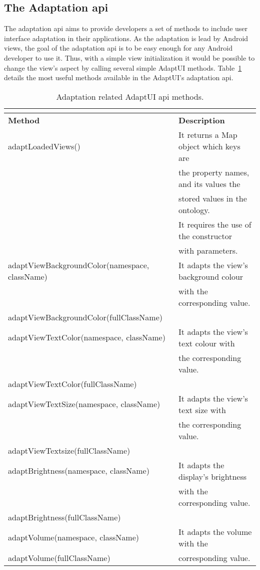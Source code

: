 \subsection{The Adaptation \ac{api}}
\label{sec:adaptation_api}

The adaptation \ac{api} aims to provide developers a set of methods to include
user interface adaptation in their applications. As the adaptation is lead by
Android views, the goal of the adaptation \ac{api} is to be easy enough for
any Android developer to use it. Thus, with a simple view initialization
it would be possible to change the view's aspect by calling several simple 
AdaptUI methods. Table~\ref{tbl:api_adaptation} details the most useful methods 
available in the AdaptUI's adaptation \ac{api}.

\begin{center}
\footnotesize
\begin{longtable}{l l}
  \caption{Adaptation related AdaptUI \ac{api} methods.}\\
  \label{tbl:api_adaptation} \\
  \hline 
  \textbf{Method}				& \textbf{Description}			\\
  \hline
  adaptLoadedViews()				& It returns a Map object which keys are\\
						& the property names, and its values the\\
						& stored values in the ontology.	\\
						& It requires the use of the constructor\\
						& with parameters.			\\
  adaptViewBackgroundColor(namespace, className)& It adapts the view's background colour\\
						& with the corresponding value.		\\
  adaptViewBackgroundColor(fullClassName)	& 					\\
  adaptViewTextColor(namespace, className)	& It adapts the view's text colour with \\
						& the corresponding value.		\\
  adaptViewTextColor(fullClassName)		&					\\
  adaptViewTextSize(namespace, className)	& It adapts the view's text size with 	\\
						& the corresponding value.		\\
  adaptViewTextsize(fullClassName)		&					\\
  adaptBrightness(namespace, className)		& It adapts the display's brightness 	\\
						& with the corresponding value.		\\
  adaptBrightness(fullClassName)		& 					\\
  adaptVolume(namespace, className)		& It adapts the volume with the 	\\
  adaptVolume(fullClassName)			& corresponding value.			\\
  \hline
\end{longtable}
\end{center}

